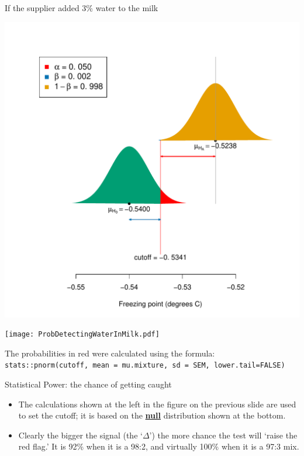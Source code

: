 \documentclass[10pt]{beamer}\usepackage[]{graphicx}\usepackage[]{color}
\makeatletter
\def\maxwidth{ %
  \ifdim\Gin@nat@width>\linewidth
    \linewidth
  \else
    \Gin@nat@width
  \fi
}
\newenvironment{knitrout}{}{} %
\makeatother
\begin{document}
\begin{frame}[fragile]{If the supplier added 3\% water to the milk}
\begin{knitrout}\tiny
{}\color{fgcolor}

{\centering \includegraphics[width=\maxwidth]{figure/unnamed-chunk-10-1} 

}


\end{knitrout}
\end{frame}



\begin{frame}
	
	\begin{center}
		\texttt{[image: ProbDetectingWaterInMilk.pdf]} 
	\end{center}
	
	\vspace*{-0.18in}
	
	{ \footnotesize
		The probabilities in red were calculated using the formula:
		\texttt{stats::pnorm(cutoff, mean = mu.mixture, sd = SEM, lower.tail=FALSE)}
	}
\end{frame}


\begin{frame}{Statistical Power: the chance of getting caught}
	\begin{itemize}
		\setlength\itemsep{1em}
		\item The calculations shown at the left in the figure on the previous slide are used to set  the cutoff; it is based on the \underline{\textbf{null}} distribution shown at the bottom. \pause  
		\item Clearly the bigger the signal (the `$\Delta$') the more chance the test will `raise the red flag.' It is 92\% when it is a 98:2, and virtually 100\% when it is a 97:3 mix.
	\end{itemize}
	
	
\end{frame}
\end{document}
